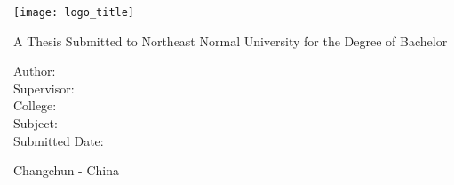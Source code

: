 \vspace{2mm}

\begin{center}
  \texttt{[image: logo\_title]}
\end{center}

\vspace{20mm}

\begin{center}
    \sanhao A Thesis Submitted to Northeast Normal University for the Degree of Bachelor
\end{center}

\vspace{20mm}

\centerline{\sanhao \textbf{\nstitlee}}

\vspace{7mm}

\begin{tabbing}
    \hspace{18mm} 
                  \= \sihao Author:\hspace{19mm} \= \underline{\makebox[8cm]{\sihao\nsauthornamee\hspace{3mm}\nsauthorid}} \\[2mm]
                  \> \sihao Supervisor: \> \underline{\makebox[8cm]{\sihao\nsmentore}} \\[2mm]
                  \> \sihao College: \> \underline{\makebox[8cm]{\sihao\nscollegee}} \\[2mm]
                  \> \sihao Subject: \> \underline{\makebox[8cm]{\sihao\nssubject}} \\[2mm]
                  \> \sihao Submitted Date: \> \underline{\makebox[8cm]{\sihao\nssubmitteddatee}}
\end{tabbing}

\vspace{20mm}

\centerline{Changchun - China}


